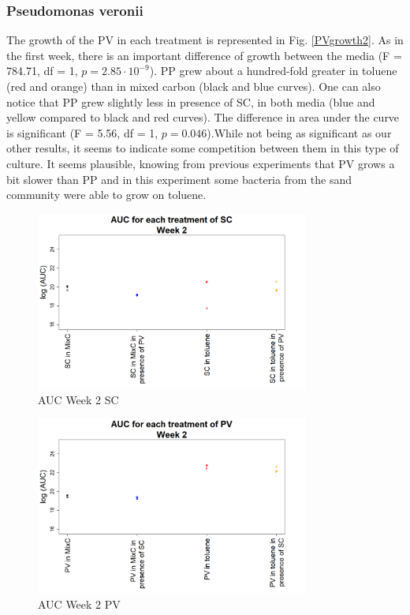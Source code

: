 \documentclass[a4paper, 10pt, conference]{ieeeconf}   %
\begin{document}
\subsubsection{Pseudomonas veronii}
The growth of the PV in each treatment is represented in Fig. \ref{PVgrowth2}.
As in the first week, there is an important difference of growth between the media (F = 784.71, df = 1, $p = 2.85 \cdot 10^{-9}$). PP grew about a hundred-fold greater in toluene (red and orange) than in mixed carbon (black and blue curves).
One can also notice that PP grew slightly less in presence of SC, in both media (blue and yellow compared to black and red curves). The difference in area under the curve is significant (F = 5.56, df = 1, $p = 0.046$).While not being as significant as our other results, it seems to indicate some competition between them in this type of culture. It seems plausible, knowing from previous experiments that PV grows a bit slower than PP and in this experiment some bacteria from the sand community were able to grow on toluene.
\newline

\begin{figure}[H]
	\centering
	\includegraphics[width=9cm]{AUCsc2.png}
	\caption{AUC Week 2 SC}
	\label{aucscw2}
\end{figure}

\begin{figure}[H]
	\centering
	\includegraphics[width=9cm]{AUCpv2.png}
	\caption{AUC Week 2 PV}
	\label{aucppw2}
\end{figure}
\end{document}
